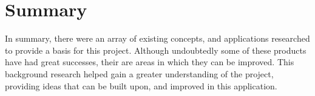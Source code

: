 \section{Summary}

In summary, there were an array of existing concepts, and applications researched to provide a basis for this project. Although undoubtedly some of these products have had great successes, their are areas in which they can be improved. This background research helped gain a greater understanding of the project, providing ideas that can be built upon, and improved in this application.